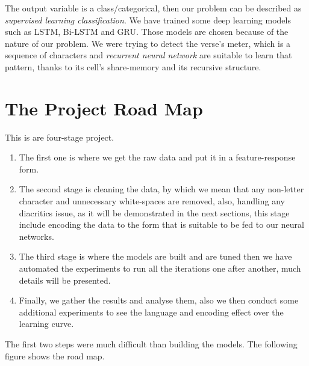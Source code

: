 \documentclass[12pt]{report}
\begin{document}
The output variable is a class/categorical, then our problem can be described as
\textit{supervised learning  classification}.  We have trained some deep learning
models such as LSTM, Bi-LSTM and GRU.  Those models are chosen because of the
nature of our problem. We were trying to detect the verse's meter, which is a
sequence of characters and \textit{recurrent neural network} are suitable  to
learn that pattern, thanks to its cell's share-memory and its recursive
structure.


\section*{The Project Road Map}
This is are four-stage project. 

\begin{enumerate}
    \item The first one is where we get the raw data and put it in a
            feature-response form.
    \item The second stage is cleaning the data, by which we mean that any
            non-letter character and unnecessary white-spaces are removed, also, handling any
            diacritics issue, as it will be demonstrated in the next sections, this stage
            include encoding the data to the form that is suitable to be fed to our neural
            networks.
    \item The third stage is where the models are built and are tuned then we
            have automated the experiments to run all the iterations one after another, much
            details will be presented.
    \item Finally, we gather the results and analyse them, also we then conduct
            some additional experiments to see the language and encoding effect over the
            learning curve.
\end{enumerate}

 

The first two steps were much difficult than
building the models. The following figure shows the road map.
\end{document}
